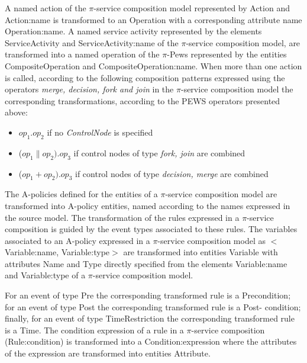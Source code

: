 A named action of the $\pi$-service composition model represented by  {\sf Action} and {\sf Action:name} is transformed to an  {\sf Operation} with a corresponding attribute name {\sf Operation:name}. A  named service activity represented by the elements {\sf ServiceActivity}  and  {\sf ServiceActivity:name} of the $\pi$-service composition model, are  transformed into a named operation of the $\pi$-{Pews} represented by the entities  {\sf CompositeOperation} and {\sf CompositeOperation:name}. When more than one action is called, according to the following  composition patterns expressed using the operators {\sc\em merge, decision, fork and join} in the $\pi$-service composition model the corresponding transformations, according to the PEWS operators presented above:
\begin{itemize}
\item   $op_1 . op_2$ if no {\sc\em ControlNode} is specified
\item ($op_1 \parallel op_2) . op_3$ if control nodes of type {\sc\em fork, join} are combined
 \item ($op_1 + op_2) . op_3$ if control nodes of type {\sc\em decision, merge} are combined
\end{itemize}



The A-policies defined for the entities of a $\pi$-service composition model are transformed into {\sf A-policy} entities, named according to the names expressed in the source model. The transformation of the rules expressed in a $\pi$-service composition is guided by the event types associated to these rules. The variables associated to an A-policy expressed in a $\pi$-service composition model as {\sf $<$Variable:name, Variable:type$>$} are transformed into entities  {\sf Variable} with attributes {\sf Name} and {\sf Type} directly specified from the elements {\sf Variable:name} and {\sf Variable:type} of a $\pi$-service composition model.

For an event of type Pre the corresponding transformed rule is a {\sf Precondition}; for an event of type Post the corresponding transformed rule is a {\sf Post- condition}; finally, for an event of type TimeRestriction the corresponding transformed rule is a {\sf Time}. The condition expression of a rule in a $\pi$-service composition ({\sf Rule:condition}) is transformed into a  {\sf Condition:expression} where the attributes of the expression are transformed into  entities {\sf Attribute}.

